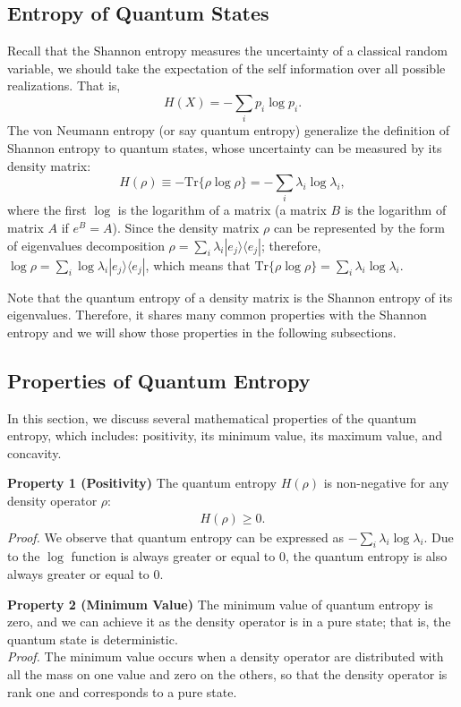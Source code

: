 \subsection{Entropy of Quantum States}
Recall that the Shannon entropy measures the uncertainty of a classical random variable, we should take the expectation of the self information over all possible realizations.
That is,
\begin{equation}
H(X) = -\sum_i p_i \log p_i.
\end{equation}
The von Neumann entropy (or say quantum entropy) generalize the definition of Shannon entropy to quantum states, whose uncertainty can be measured by its density matrix:
\begin{equation}
H(\rho) \equiv - \text{Tr} \{ \rho \log \rho \} = -\sum_{i} \lambda_i \log \lambda_i,
\end{equation}
where the first $\log$ is the logarithm of a matrix (a matrix $B$ is the logarithm of matrix $A$ if $e^B = A$).
Since the density matrix $\rho$ can be represented by the form of eigenvalues decomposition $\rho = \sum_{i} \lambda_i |e_j\rangle \langle e_j|$; therefore, $\log \rho = \sum_{i} \log \lambda_i |e_j\rangle \langle e_j|$, which means that $\text{Tr} \{ \rho \log \rho \} = \sum_{i} \lambda_i \log \lambda_i$.

Note that the quantum entropy of a density matrix is the Shannon entropy of its eigenvalues.
Therefore, it shares many common properties with the Shannon entropy and we will show those properties in the following subsections.

\subsection{Properties of Quantum Entropy}
In this section, we discuss several mathematical properties of the quantum entropy, which includes: positivity, its minimum value, its maximum value, and concavity.

\textbf{Property 1 (Positivity)} The quantum entropy $H(\rho)$ is non-negative for any density operator $\rho$:
\begin{align}
H(\rho) \geq 0.
\end{align}
\textit{Proof.} We observe that quantum entropy can be expressed as  $-\sum_{i} \lambda_i \log \lambda_i$. Due to the $\log$ function is always greater or equal to $0$, the quantum entropy is also always greater or equal to 0.

\textbf{Property 2 (Minimum Value)}
The minimum value of quantum entropy is zero, and we can achieve it as the density operator is in a pure state; that is, the quantum state is deterministic. \\
\textit{Proof.} The minimum value occurs when a density operator are distributed with all the mass on one value and zero on the others, so that the density operator is rank one and corresponds to a pure state.

